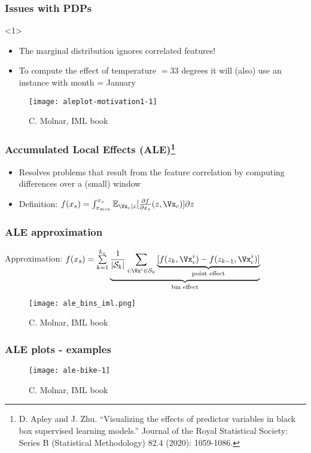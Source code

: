 \begin{frame}
 \frametitle{Issues with PDPs}
 \begin{onlyenv}<1>
   \begin{itemize}
   \item The marginal distribution ignores correlated features!
   \item To compute the effect of temperature $=33$ degrees it will (also) use an instance
       with month = January
   \end{itemize}
   \begin{figure}
     \texttt{[image: aleplot-motivation1-1]}
     \caption{\footnotesize C. Molnar, IML book}
   \end{figure}
 \end{onlyenv}
\end{frame}


\begin{frame}
 \frametitle{Accumulated Local Effects (ALE)\footnote{D. Apley and
   J. Zhu. ``Visualizing the effects of predictor variables in black box
   supervised learning models.'' Journal of the Royal Statistical Society:
   Series B (Statistical Methodology) 82.4 (2020): 1059-1086.}}

 \begin{itemize}
 \item Resolves problems that result from the feature correlation by computing
   differences over a (small) window
 \item Definition: \(f(x_s) = \int_{x_{min}}^{x_s}\mathbb{E}_{\Vx_c|z}[ \frac{\partial f}{\partial x_s}(z, \Vx_c)] \partial z\)
 \end{itemize}
\end{frame}

\begin{frame}
 \frametitle{ALE approximation}
 Approximation: \(f(x_s) = \sum\limits_{k=1}^{k_x}
 \underbrace{\frac{1}{|\mathcal{S}_k|} \sum_{i:\Vx^i \in \mathcal{S}_k}
   \underbrace{[f(z_k, \Vx^i_c) - f(z_{k-1}, \Vx^i_c)]}_{\text{point
       effect}}}_{\text{bin effect}} \)

 \begin{figure}[ht]
   \centering
   \texttt{[image: ale\_bins\_iml.png]}
   \caption{\footnotesize C. Molnar, IML book}
 \end{figure}
\end{frame}

\begin{frame}
 \frametitle{ALE plots - examples}
 \begin{figure}
   \texttt{[image: ale-bike-1]}
   \caption{\footnotesize C. Molnar, IML book}
 \end{figure}
\end{frame}
